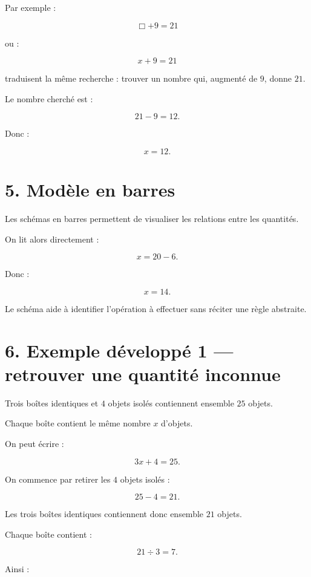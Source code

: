 Par exemple :

\[
\Box+9=21
\]

ou :

\[
x+9=21
\]

traduisent la même recherche : trouver un nombre qui, augmenté de $9$, donne $21$.

Le nombre cherché est :

\[
21-9=12.
\]

Donc :

\[
x=12.
\]

\section{5. Modèle en barres}

Les schémas en barres permettent de visualiser les relations entre les quantités.


On lit alors directement :

\[
x=20-6.
\]

Donc :

\[
\boxed{x=14}.
\]

Le schéma aide à identifier l’opération à effectuer sans réciter une règle abstraite.

\section{6. Exemple développé 1 — retrouver une quantité inconnue}

Trois boîtes identiques et $4$ objets isolés contiennent ensemble $25$ objets.

Chaque boîte contient le même nombre $x$ d’objets.

On peut écrire :

\[
3x+4=25.
\]

On commence par retirer les $4$ objets isolés :

\[
25-4=21.
\]

Les trois boîtes identiques contiennent donc ensemble $21$ objets.

Chaque boîte contient :

\[
21\div3=7.
\]

Ainsi :

